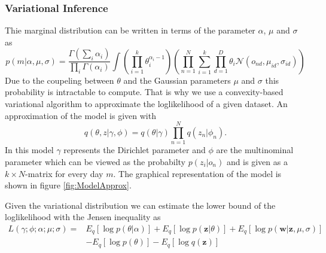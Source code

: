 \documentclass[11pt,a4paper]{article}
\begin{document}
  
  \subsubsection{Variational Inference}
 
  Thie marginal distribution can be written in terms of the parameter $\alpha$, $\mu$ and $\sigma$ as
  \begin{equation}
   p(m|\alpha,\mu,\sigma) = \frac{\Gamma (\sum_i \alpha_i)}{\prod_i \Gamma(\alpha_i)} \int \left( \prod_{i=1}^k \theta_i^{\alpha_i-1} \right)
   \left( \prod_{n=1}^N \sum_{i=1}^k \prod_{d=1}^D \theta_i \mathcal{N}(o_{nd},\mu_{id},\sigma_{id} ) \right)
  \end{equation}
  Due to the coupeling between $\theta$ and the Gaussian parameters $\mu$ and $\sigma$ this probability is intractable to compute. That is why we use a convexity-based variational algorithm to approximate the loglikelihood of a given dataset. 
  An approximation of the model is given with 
  \begin{equation}
   q(\theta,z|\gamma,\phi) = q(\theta|\gamma) \prod_{n=1}^N q(z_n|\phi_n).
  \end{equation}
  In this model $\gamma$ represents the Dirichlet parameter and $\phi$ are the multinominal parameter which can be viewed as the probabilty $p(z_i|o_n)$ and is given as a $k \times N$-matrix for every day $m$. The graphical representation of the model is shown in figure \ref{fig:ModelApprox}.
  
%  
%
%  
  
  
  
  Given the variational distribution we can estimate the lower bound of the loglikelihood with the Jensen inequality as
  \begin{equation}
   \begin{split}
    L(\gamma;\phi;\alpha;\mu;\sigma) =& E_q[\log p(\theta|\alpha)] + E_q[\log p(\textbf{z}|\theta)] + E_q[\log p(\textbf{w}|\textbf{z},\mu,\sigma)] \\
   & -E_q[\log p(\theta)] - E_q[\log q(\textbf{z})]
   \end{split}
  \end{equation}
\end{document}
